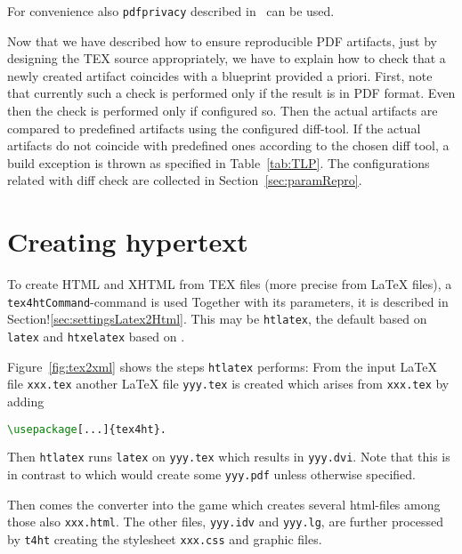 For convenience also \texttt{pdfprivacy} described in~\cite{PdfPriv} can be used. 
\medskip


Now that we have described how to ensure reproducible PDF artifacts, 
just by designing the TEX source appropriately, 
we have to explain how to check that a newly created artifact 
coincides with a blueprint provided a priori. 
First, note that currently such a check is performed 
only if the result is in PDF format. 
Even then the check is performed only if configured so. 
Then the actual artifacts are compared to predefined artifacts 
using the configured diff-tool. 
If the actual artifacts do not coincide with predefined ones 
according to the chosen diff tool, 
a build exception is thrown as specified in Table~\ref{tab:TLP}. 
The configurations related with diff check are collected in Section~\ref{sec:paramRepro}. 



\section{Creating hypertext}\label{sec:tex2html}

To create HTML and XHTML from TEX files (more precise from \LaTeX{} files), 
a \texttt{tex4htCommand}-command is used 
Together with its parameters, 
it is described in Section!\ref{sec:settingsLatex2Html}. 
This may be \texttt{htlatex}, the default based on \texttt{latex} 
and \texttt{htxelatex} based on \xelatex. 

Figure~\ref{fig:tex2xml} shows the steps \texttt{htlatex} performs: 
From the input \LaTeX{} file \texttt{xxx.tex} 
another \LaTeX{} file \texttt{yyy.tex} is created 
which arises from \texttt{xxx.tex} by adding 
\begin{lstlisting}[language=TeX]
\usepackage[...]{tex4ht}. 
\end{lstlisting}
%
Then \texttt{htlatex} runs \texttt{latex} on \texttt{yyy.tex} 
which results in \texttt{yyy.dvi}. 
Note that this is in contrast to \lualatex{} 
which would create some \texttt{yyy.pdf} unless otherwise specified. 

Then comes the converter  into the game 
which creates several html-files among those also \texttt{xxx.html}. 
The other files, \texttt{yyy.idv} and \texttt{yyy.lg}, 
are further processed by \texttt{t4ht} 
creating the stylesheet \texttt{xxx.css} and graphic files. 
\medskip


